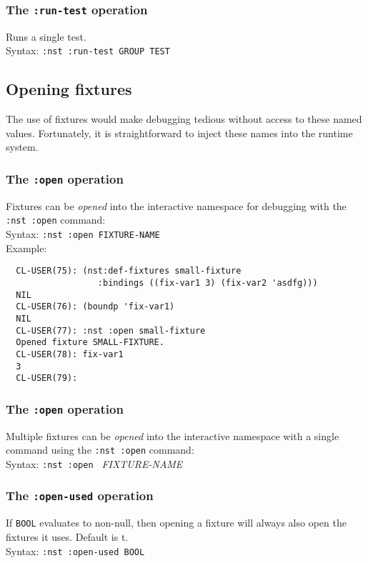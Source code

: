 \documentclass{article}
\begin{document}
\subsubsection{The \texttt{:run-test} operation}
%
Runs a single test.
\\ Syntax: \texttt{:nst :run-test GROUP TEST}

\subsection{Opening fixtures}
The use of fixtures would make debugging tedious without access to
these named values.  Fortunately, it is straightforward to inject
these names into the runtime system.

\subsubsection{The \texttt{:open} operation}
%
Fixtures can be \emph{opened} into the
interactive namespace for debugging with the
\texttt{:nst~:open} command:
\\ Syntax: \texttt{:nst :open FIXTURE-NAME}
\\ Example:
\begin{verbatim}
  CL-USER(75): (nst:def-fixtures small-fixture
                  :bindings ((fix-var1 3) (fix-var2 'asdfg)))
  NIL
  CL-USER(76): (boundp 'fix-var1)
  NIL
  CL-USER(77): :nst :open small-fixture
  Opened fixture SMALL-FIXTURE.
  CL-USER(78): fix-var1
  3
  CL-USER(79): 
\end{verbatim}

\subsubsection{The \texttt{:open{\textasteriskcentered}} operation}
%
Multiple fixtures can be \emph{opened} into the
interactive namespace with a single command using the
\texttt{:nst~:open} command:
\\ Syntax: \texttt{:nst :open\* } {\textit{FIXTURE-NAME}{\textasteriskcentered}}


\subsubsection{The \texttt{:open-used} operation}
%
If \texttt{BOOL} evaluates to non-null, then opening a fixture will
always also open the fixtures it uses.  Default is t.
\\ Syntax: \texttt{:nst :open-used BOOL}
\end{document}
